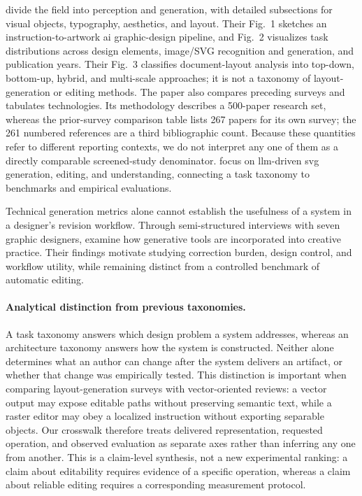 \citet{zou2025fragment} divide the field into perception and generation, with detailed subsections for visual objects, typography, aesthetics, and layout.
Their Fig.~1 sketches an instruction-to-artwork \ac{ai} graphic-design pipeline, and Fig.~2 visualizes task distributions across design elements, image/SVG recognition and generation, and publication years.
Their Fig.~3 classifies document-layout analysis into top-down, bottom-up, hybrid, and multi-scale approaches; it is not a taxonomy of layout-generation or editing methods.
The paper also compares preceding surveys and tabulates technologies.
Its methodology describes a 500-paper research set, whereas the prior-survey comparison table lists 267 papers for its own survey; the 261 numbered references are a third bibliographic count.
Because these quantities refer to different reporting contexts, we do not interpret any one of them as a directly comparable screened-study denominator.
\citet{malashenko2025svgreview} focus on \ac{llm}-driven \ac{svg} generation, editing, and understanding, connecting a task taxonomy to benchmarks and empirical evaluations.

Technical generation metrics alone cannot establish the usefulness of a system in a designer's revision workflow.
Through semi-structured interviews with seven graphic designers, \citet{tang2024designinterviews} examine how generative tools are incorporated into creative practice.
Their findings motivate studying correction burden, design control, and workflow utility, while remaining distinct from a controlled benchmark of automatic editing.

\paragraph{Analytical distinction from previous taxonomies.}
A task taxonomy answers which design problem a system addresses, whereas an architecture taxonomy answers how the system is constructed.
Neither alone determines what an author can change after the system delivers an artifact, or whether that change was empirically tested.
This distinction is important when comparing layout-generation surveys with vector-oriented reviews: a vector output may expose editable paths without preserving semantic text, while a raster editor may obey a localized instruction without exporting separable objects.
Our crosswalk therefore treats delivered representation, requested operation, and observed evaluation as separate axes rather than inferring any one from another.
This is a claim-level synthesis, not a new experimental ranking: a claim about editability requires evidence of a specific operation, whereas a claim about reliable editing requires a corresponding measurement protocol.

